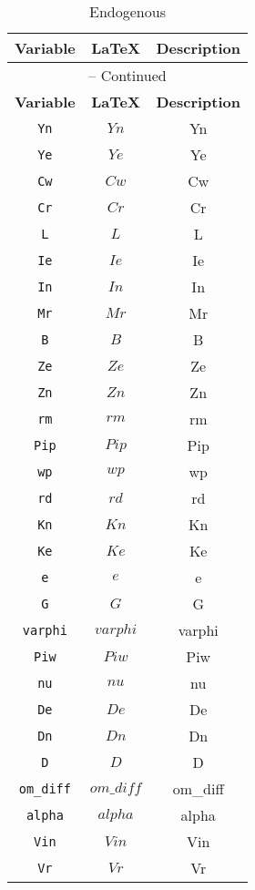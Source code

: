 \begin{center}
\begin{longtable}{ccc}
\caption{Endogenous}\\%
\hline%
\multicolumn{1}{c}{\textbf{Variable}} &
\multicolumn{1}{c}{\textbf{\LaTeX}} &
\multicolumn{1}{c}{\textbf{Description}}\\%
\hline\hline%
\endfirsthead
\multicolumn{3}{c}{{\tablename} \thetable{} -- Continued}\\%
\hline%
\multicolumn{1}{c}{\textbf{Variable}} &
\multicolumn{1}{c}{\textbf{\LaTeX}} &
\multicolumn{1}{c}{\textbf{Description}}\\%
\hline\hline%
\endhead
\texttt{Yn} & $Yn$ & Yn\\
\texttt{Ye} & $Ye$ & Ye\\
\texttt{Cw} & $Cw$ & Cw\\
\texttt{Cr} & $Cr$ & Cr\\
\texttt{L} & $L$ & L\\
\texttt{Ie} & $Ie$ & Ie\\
\texttt{In} & $In$ & In\\
\texttt{Mr} & $Mr$ & Mr\\
\texttt{B} & $B$ & B\\
\texttt{Ze} & $Ze$ & Ze\\
\texttt{Zn} & $Zn$ & Zn\\
\texttt{rm} & $rm$ & rm\\
\texttt{Pip} & $Pip$ & Pip\\
\texttt{wp} & $wp$ & wp\\
\texttt{rd} & $rd$ & rd\\
\texttt{Kn} & $Kn$ & Kn\\
\texttt{Ke} & $Ke$ & Ke\\
\texttt{e} & $e$ & e\\
\texttt{G} & $G$ & G\\
\texttt{varphi} & $varphi$ & varphi\\
\texttt{Piw} & $Piw$ & Piw\\
\texttt{nu} & $nu$ & nu\\
\texttt{De} & $De$ & De\\
\texttt{Dn} & $Dn$ & Dn\\
\texttt{D} & $D$ & D\\
\texttt{om\_diff} & $om\_diff$ & om\_diff\\
\texttt{alpha} & $alpha$ & alpha\\
\texttt{Vin} & $Vin$ & Vin\\
\texttt{Vr} & $Vr$ & Vr\\

\end{longtable}
\end{center}
